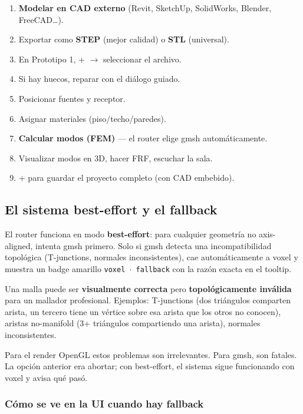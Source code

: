 \documentclass[11pt, a4paper]{article}
\newenvironment{nota}[1][Nota]{%
  \begin{tcolorbox}[mybox=cBlue, title={#1}]%
}{\end{tcolorbox}}
\newcommand{\tecla}[1]{\texttt{\small\fbox{#1}}}
\newcommand{\menu}[1]{\textbf{\guillemotleft #1\guillemotright}}
\begin{document}
\begin{enumerate}[itemsep=3pt]
  \item \textbf{Modelar en CAD externo} (Revit, SketchUp, SolidWorks,
        Blender, FreeCAD\ldots).
  \item Exportar como \textbf{STEP} (mejor calidad) o \textbf{STL}
        (universal).
  \item En Prototipo 1, \tecla{Ctrl} + \tecla{I} $\to$ seleccionar el
        archivo.
  \item Si hay huecos, reparar con el diálogo guiado.
  \item Posicionar fuentes y receptor.
  \item Asignar materiales (piso/techo/paredes).
  \item \menu{Calcular modos (FEM)} — el router elige gmsh
        automáticamente.
  \item Visualizar modos en 3D, hacer FRF, escuchar la sala.
  \item \tecla{Ctrl} + \tecla{S} para guardar el proyecto completo
        (con CAD embebido).
\end{enumerate}

\subsection{El sistema best-effort y el fallback}

El router funciona en modo \textbf{best-effort}: para cualquier geometría
no axis-aligned, intenta gmsh primero. Solo si gmsh detecta una
incompatibilidad topológica (T-junctions, normales inconsistentes), cae
automáticamente a voxel y muestra un badge amarillo
\texttt{voxel $\cdot$ fallback} con la razón exacta en el tooltip.

\begin{nota}[Por qué existe el fallback]
Una malla puede ser \textbf{visualmente correcta} pero
\textbf{topológicamente inválida} para un mallador profesional. Ejemplos:
T-junctions (dos triángulos comparten arista, un tercero tiene un vértice
sobre esa arista que los otros no conocen), aristas no-manifold (3+
triángulos compartiendo una arista), normales inconsistentes.

Para el render OpenGL estos problemas son irrelevantes. Para gmsh, son
fatales. La opción anterior era abortar; con best-effort, el sistema sigue
funcionando con voxel y avisa qué pasó.
\end{nota}

\subsubsection*{Cómo se ve en la UI cuando hay fallback}
\end{document}
